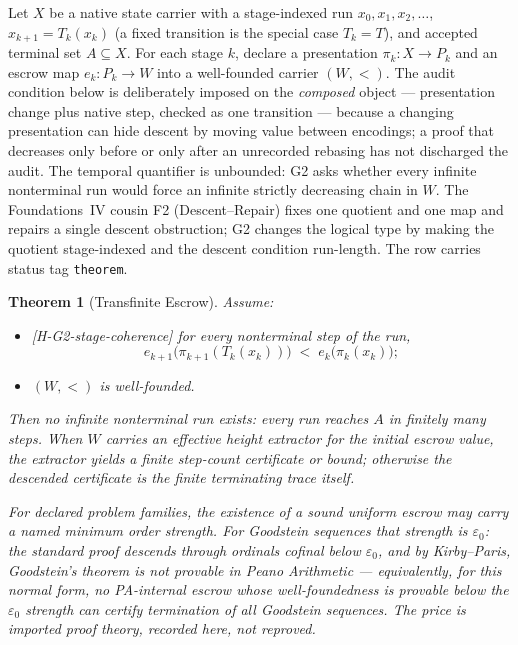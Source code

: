 \documentclass[11pt]{article}
\newcommand{\lawGTwo}{Transfinite Escrow}
\newtheorem{theorem}{Theorem}[section]
\theoremstyle{definition}
\begin{document}
Let $X$ be a native state carrier with a stage-indexed run $x_0, x_1, x_2, \ldots$,
$x_{k+1} = T_k(x_k)$ (a fixed transition is the special case $T_k = T$), and accepted terminal set
$A \subseteq X$. For each stage $k$, declare a presentation $\pi_k : X \to P_k$ and an escrow map
$e_k : P_k \to W$ into a well-founded carrier $(W, <)$. The audit condition below is deliberately
imposed on the \emph{composed} object --- presentation change plus native step, checked as one
transition --- because a changing presentation can hide descent by moving value between encodings; a
proof that decreases only before or only after an unrecorded rebasing has not discharged the audit.
The temporal quantifier is unbounded: G2 asks whether every infinite nonterminal run would force an
infinite strictly decreasing chain in $W$. The Foundations~IV cousin F2 (Descent--Repair) fixes one
quotient and one map and repairs a single descent obstruction; G2 changes the logical type by making
the quotient stage-indexed and the descent condition run-length. The row carries status tag
\texttt{theorem}.

\begin{theorem}[\lawGTwo]\label{thm:G2}
Assume:
\begin{itemize}
  \item \textup{[H-G2-stage-coherence]} for every nonterminal step of the run,
    \[
      e_{k+1}\bigl(\pi_{k+1}(T_k(x_k))\bigr) \;<\; e_k\bigl(\pi_k(x_k)\bigr);
    \]
  \item $(W, <)$ is well-founded.
\end{itemize}
Then no infinite nonterminal run exists: every run reaches $A$ in finitely many steps. When $W$
carries an effective height extractor for the initial escrow value, the extractor yields a finite
step-count certificate or bound; otherwise the descended certificate is the finite terminating trace
itself.

For declared problem families, the existence of a sound uniform escrow may carry a named minimum order
strength. For Goodstein sequences that strength is $\varepsilon_0$: the standard proof descends
through ordinals cofinal below $\varepsilon_0$, and by Kirby--Paris, Goodstein's theorem is not
provable in Peano Arithmetic --- equivalently, for this normal form, no PA-internal escrow whose
well-foundedness is provable below the $\varepsilon_0$ strength can certify termination of all
Goodstein sequences. The price is imported proof theory, recorded here, not reproved.
\end{theorem}
\end{document}
